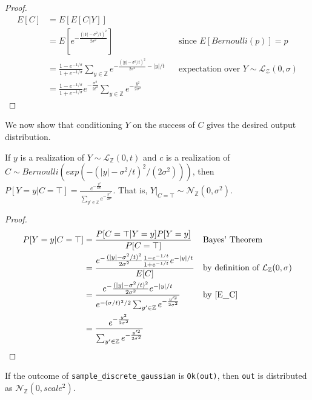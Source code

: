 \documentclass{article}
\begin{document}
\begin{proof}
    \begin{align*}
        E[C] &= E[E[C|Y]] \\
        &= E[e^{-\frac{(|Y| - \sigma^2/t)^2}{2\sigma^2}}] && \text{since } E[Bernoulli(p)] = p \\
        &= \frac{1 - e^{-1/\sigma}}{1 + e^{-1/\sigma}} \sum_{y\in \mathbb{Z}} e^{-\frac{(|y| - \sigma^2/t)^2}{2\sigma^2} - |y|/t} && \text{expectation over } Y \sim \mathcal{L}_\mathcal{Z}(0, \sigma) \\
        &= \frac{1 - e^{-1/\sigma}}{1 + e^{-1/\sigma}}e^{-\frac{\sigma^2}{2t^2}} \sum_{y\in \mathbb{Z}} e^{-\frac{y^2}{2\sigma^2}}
    \end{align*}
\end{proof}

We now show that conditioning $Y$ on the success of $C$ gives the desired output distribution.
\begin{theorem}\cite{CKS20}
    \label{P_Yy_CT} If $y$ is a realization of $Y \sim \mathcal{L}_\mathbb{Z}(0, t)$ and $c$ is a realization of $C \sim Bernoulli(exp(-(|y| - \sigma^2 / t)^2 / (2 \sigma^2)))$, then
    $P[Y=y | C=\top] = \frac{e^{-\frac{y^2}{2\sigma^2}}}{\sum_{y' \in \mathbb{Z}} e^{-\frac{y'^2}{2\sigma^2}}}$. That is, $Y|_{C=\top} \sim \mathcal{N}_\mathbb{Z}(0, \sigma^2)$.
\end{theorem}

\begin{proof}
    \begin{align*}
        P[Y=y | C=\top] &= \frac{P[C=\top|Y=y]P[Y=y]}{P[C=\top]} && \text{Bayes' Theorem} \\
        &= \frac{e^-\frac{(|y| - \sigma^2/t)^2}{2\sigma^2} \frac{1 - e^{-1/t}}{1 + e^{-1/t}} e^{-|y|/t}}{E[C]} && \text{by definition of } \mathcal{L}_\mathbb{Z}(0, \sigma) \\
        &= \frac{e^-\frac{(|y| - \sigma^2/t)^2}{2\sigma^2} e^{-|y|/t}}{e^{-(\sigma/t)^2/2} \sum_{y' \in \mathbb{Z}} e^{-\frac{y'^2}{2\sigma^2}}} && \text{by } \ref{E_C}\\
        &= \frac{e^{-\frac{y^2}{2\sigma^2}}}{\sum_{y' \in \mathbb{Z}} e^{-\frac{y'^2}{2\sigma^2}}}
    \end{align*}
\end{proof}

\begin{lemma}
    \label{ok-out}
    If the outcome of \texttt{sample\_discrete\_gaussian} is \texttt{Ok(out)}, 
    then \texttt{out} is distributed as $\mathcal{N}_\mathbb{Z}(0, scale^2)$.
\end{lemma}
\end{document}
